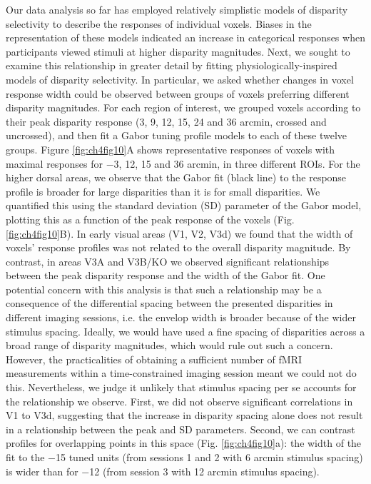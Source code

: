Our data analysis so far has employed relatively simplistic models of disparity selectivity to describe the responses of individual voxels. Biases in the representation of these models indicated an increase in categorical responses when participants viewed stimuli at higher disparity magnitudes. Next, we sought to examine this relationship in greater detail by fitting physiologically-inspired models of disparity selectivity. In particular, we asked whether changes in voxel response width could be observed between groups of voxels preferring different disparity magnitudes. 
For each region of interest, we grouped voxels according to their peak disparity response (3, 9, 12, 15, 24 and 36 arcmin, crossed and uncrossed), and then fit a Gabor tuning profile models to each of these twelve groups. Figure \ref{fig:ch4fig10}A shows representative responses of voxels with maximal responses for $-$3, 12, 15 and 36 arcmin, in three different ROIs. For the higher dorsal areas, we observe that the Gabor fit (black line) to the response profile is broader for large disparities than it is for small disparities. We quantified this using the standard deviation (SD) parameter of the Gabor model, plotting this as a function of the peak response of the voxels (Fig. \ref{fig:ch4fig10}B). In early visual areas (V1, V2, V3d) we found that the width of voxels' response profiles was not related to the overall disparity magnitude. By contrast, in areas V3A and V3B/KO we observed significant relationships between the peak disparity response and the width of the Gabor fit.
One potential concern with this analysis is that such a relationship may be a consequence of the differential spacing between the presented disparities in different imaging sessions, i.e. the envelop width is broader because of the wider stimulus spacing. Ideally, we would have used a fine spacing of disparities across a broad range of disparity magnitudes, which would rule out such a concern. However, the practicalities of obtaining a sufficient number of fMRI measurements within a time-constrained imaging session meant we could not do this. Nevertheless, we judge it unlikely that stimulus spacing per se accounts for the relationship we observe. First, we did not observe significant correlations in V1 to V3d, suggesting that the increase in disparity spacing alone does not result in a relationship between the peak and SD parameters. Second, we can contrast profiles for overlapping points in this space (Fig. \ref{fig:ch4fig10}a): the width of the fit to the $-$15 tuned units (from sessions 1 and 2 with 6 arcmin stimulus spacing) is wider than for $-$12 (from session 3 with 12 arcmin stimulus spacing). 

